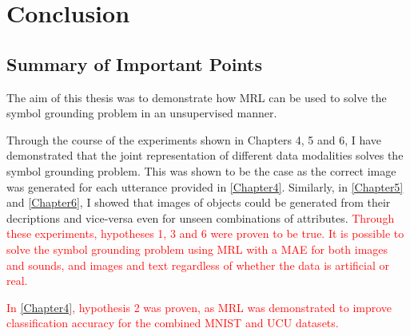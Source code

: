 
\chapter{Conclusion} %

\label{Chapter7} %



\section{Summary of Important Points}
The aim of this thesis was to demonstrate how \ac{MRL} can be used to solve the symbol grounding problem in an unsupervised manner.

Through the course of the experiments shown in Chapters 4, 5 and 6, I have demonstrated that the joint representation of different data modalities solves the symbol grounding problem. This was shown to be the case as the correct image was generated for each utterance provided in \autoref{Chapter4}. Similarly, in \autoref{Chapter5} and \autoref{Chapter6}, I showed that images of objects could be generated from their decriptions and vice-versa even for unseen combinations of attributes. \textcolor{red}{Through these experiments, hypotheses 1, 3 and 6 were proven to be true. It is possible to solve the symbol grounding problem using \ac{MRL} with a \ac{MAE} for both images and sounds, and images and text regardless of whether the data is artificial or real.}

\textcolor{red}{In \autoref{Chapter4}, hypothesis 2 was proven, as \ac{MRL} was demonstrated to improve classification accuracy for the combined MNIST and UCU datasets.}

